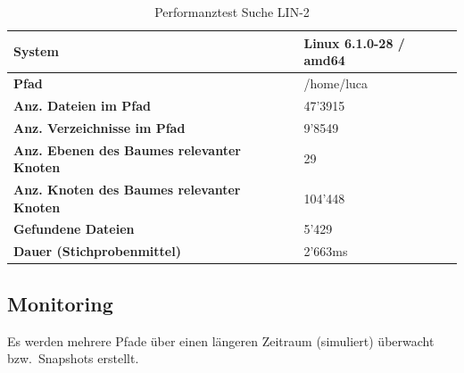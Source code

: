 \documentclass[a4paper,12pt]{report}
\begin{document}
    \begin{table}[h!]
        \centering
        \setlength{\leftmargini}{0.8cm}
        \begin{tabular}{|p{7cm}|p{5cm}|}
            \hline
            \textbf{System}                                            & Linux 6.1.0-28 / amd64 \\ \hline
            \textbf{Pfad}                                              & /home/luca             \\ \hline
            \textbf{Anz. Dateien im Pfad}                              & 47'3915                \\ \hline
            \textbf{Anz. Verzeichnisse im Pfad}                        & 9'8549                 \\ \hline
            \textbf{Anz. Ebenen \newline des Baumes relevanter Knoten} & 29                     \\ \hline
            \textbf{Anz. Knoten \newline des Baumes relevanter Knoten} & 104'448                \\ \hline
            \textbf{Gefundene Dateien}                                 & 5'429                  \\ \hline
            \textbf{Dauer (Stichprobenmittel)}                         & 2'663ms                \\ \hline
        \end{tabular}
        \caption{Performanztest Suche LIN-2}\label{tab:perf-search-lin-2}
    \end{table}

    \clearpage

    \subsection{Monitoring}\label{subsec:monitoring)}
    Es werden mehrere Pfade über einen längeren Zeitraum (simuliert) überwacht bzw.\ Snapshots erstellt.
\end{document}
